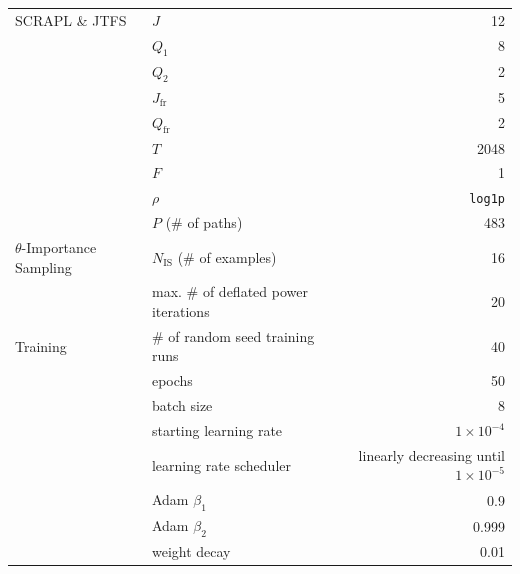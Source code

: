 \documentclass{article} %
\theoremstyle{plain}
\theoremstyle{definition}
\theoremstyle{remark}
\begin{document}
\begin{table}[H]
\begin{tabular}{
    llr
}
    \midrule
    SCRAPL \& JTFS & $J$ & 12 \\
    & $Q_1$ & 8 \\
    & $Q_2$ & 2 \\
    & $J_{\mathrm{fr}}$ & 5 \\
    & $Q_{\mathrm{fr}}$ & 2 \\
    & $T$ & 2048 \\
    & $F$ & 1 \\
    & $\rho$ & \texttt{log1p} \\
    & $P$ (\# of paths) & 483 \\
    \midrule
    $\theta$-Importance Sampling & $N_{\mathrm{IS}}$ (\# of examples) & 16 \\
    & max. \# of deflated power iterations & 20 \\
    \midrule
    Training & \# of random seed training runs & 40 \\
    & epochs & 50 \\
    & batch size & 8 \\
    & starting learning rate & $1 \times 10^{-4}$ \\
    & learning rate scheduler & linearly decreasing until $1 \times 10^{-5}$ \\
    & Adam $\beta_1$ & 0.9 \\
    & Adam $\beta_2$ & 0.999 \\
    & weight decay & 0.01 \\
    \bottomrule
\end{tabular}
\end{table}
\end{document}
